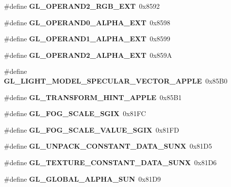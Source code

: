 \begin{DoxyCompactItemize}
\item 
\#define {\bfseries G\+L\+\_\+\+O\+P\+E\+R\+A\+N\+D2\+\_\+\+R\+G\+B\+\_\+\+E\+X\+T}~0x8592\label{_s_d_l__opengl_8h_ac46e7ba74ead005d719e703f326ac0e0}

\item 
\#define {\bfseries G\+L\+\_\+\+O\+P\+E\+R\+A\+N\+D0\+\_\+\+A\+L\+P\+H\+A\+\_\+\+E\+X\+T}~0x8598\label{_s_d_l__opengl_8h_ae40184d42da6833f833b26c3e764264d}

\item 
\#define {\bfseries G\+L\+\_\+\+O\+P\+E\+R\+A\+N\+D1\+\_\+\+A\+L\+P\+H\+A\+\_\+\+E\+X\+T}~0x8599\label{_s_d_l__opengl_8h_ab0928f78d8cf1fe5513aaefdb9ae274f}

\item 
\#define {\bfseries G\+L\+\_\+\+O\+P\+E\+R\+A\+N\+D2\+\_\+\+A\+L\+P\+H\+A\+\_\+\+E\+X\+T}~0x859\+A\label{_s_d_l__opengl_8h_a3cfa377dc5d7259842117197b2bc8a74}

\item 
\#define {\bfseries G\+L\+\_\+\+L\+I\+G\+H\+T\+\_\+\+M\+O\+D\+E\+L\+\_\+\+S\+P\+E\+C\+U\+L\+A\+R\+\_\+\+V\+E\+C\+T\+O\+R\+\_\+\+A\+P\+P\+L\+E}~0x85\+B0\label{_s_d_l__opengl_8h_ac916790f08a1a79f366c018ce0b9012b}

\item 
\#define {\bfseries G\+L\+\_\+\+T\+R\+A\+N\+S\+F\+O\+R\+M\+\_\+\+H\+I\+N\+T\+\_\+\+A\+P\+P\+L\+E}~0x85\+B1\label{_s_d_l__opengl_8h_ae5983a1005e3fd7b8b845b1b222e1b5c}

\item 
\#define {\bfseries G\+L\+\_\+\+F\+O\+G\+\_\+\+S\+C\+A\+L\+E\+\_\+\+S\+G\+I\+X}~0x81\+F\+C\label{_s_d_l__opengl_8h_a8da36320d0603687fefd8e00f7c318fb}

\item 
\#define {\bfseries G\+L\+\_\+\+F\+O\+G\+\_\+\+S\+C\+A\+L\+E\+\_\+\+V\+A\+L\+U\+E\+\_\+\+S\+G\+I\+X}~0x81\+F\+D\label{_s_d_l__opengl_8h_acbd15d49d0d118877cebf5411f3f244a}

\item 
\#define {\bfseries G\+L\+\_\+\+U\+N\+P\+A\+C\+K\+\_\+\+C\+O\+N\+S\+T\+A\+N\+T\+\_\+\+D\+A\+T\+A\+\_\+\+S\+U\+N\+X}~0x81\+D5\label{_s_d_l__opengl_8h_a09401c55355a5d415dd2940ecd413987}

\item 
\#define {\bfseries G\+L\+\_\+\+T\+E\+X\+T\+U\+R\+E\+\_\+\+C\+O\+N\+S\+T\+A\+N\+T\+\_\+\+D\+A\+T\+A\+\_\+\+S\+U\+N\+X}~0x81\+D6\label{_s_d_l__opengl_8h_a80f3779b5c63acd7ea8da46f95d31c58}

\item 
\#define {\bfseries G\+L\+\_\+\+G\+L\+O\+B\+A\+L\+\_\+\+A\+L\+P\+H\+A\+\_\+\+S\+U\+N}~0x81\+D9\label{_s_d_l__opengl_8h_a0056039b84c248f8a4db45d7e57cf5f4}


\end{DoxyCompactItemize}
